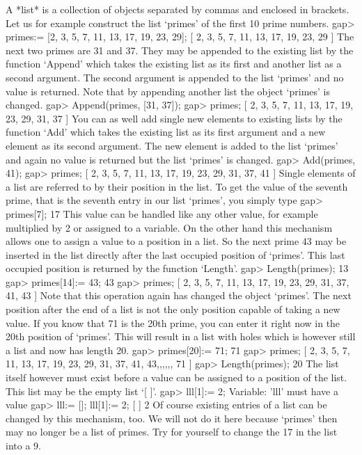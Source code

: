 A *list* is a collection of objects separated by  commas and enclosed  in
brackets.  Let us for example construct the list `primes' of the first 10
prime numbers.
\beginexample
gap> primes:= [2, 3, 5, 7, 11, 13, 17, 19, 23, 29];
[ 2, 3, 5, 7, 11, 13, 17, 19, 23, 29 ]
\endexample
The next two primes are  31 and 37.  They may be appended to the existing
list by the function `Append' which takes  the existing list as its first
and another list as a second argument.  The  second argument  is appended
to the list `primes' and  no  value is returned.  Note that  by appending
another list the object `primes' is changed.
\beginexample
gap> Append(primes, [31, 37]);
gap> primes;
[ 2, 3, 5, 7, 11, 13, 17, 19, 23, 29, 31, 37 ]
\endexample
You can as well add single new elements to existing lists by the function
`Add'  which takes  the existing list  as its  first argument  and  a new
element as  its second argument.  The  new  element  is added to the list
`primes' and again no value is returned but the list `primes' is changed.
\beginexample
gap> Add(primes, 41);
gap> primes;
[ 2, 3, 5, 7, 11, 13, 17, 19, 23, 29, 31, 37, 41 ]
\endexample
Single elements of a list are referred to by their position in the  list.
To get the value  of the seventh prime, that is the seventh entry in  our
list `primes', you simply type
\beginexample
gap> primes[7];
17
\endexample
This value can be handled like any other value, for example multiplied by 2
or assigned to a  variable. On the other hand  this mechanism allows one to
assign a value to  a position in  a  list. So the   next prime 43  may be
inserted  in the   list directly  after the  last   occupied position  of
`primes'. This  last occupied    position  is returned  by  the  function
`Length'.
\beginexample
gap> Length(primes);
13
gap> primes[14]:= 43;
43
gap> primes;
[ 2, 3, 5, 7, 11, 13, 17, 19, 23, 29, 31, 37, 41, 43 ]
\endexample
Note that this operation again has changed the object `primes'.  The
next position after the end of a list is not the only position capable
of taking a new value.  If you know that 71 is the 20th prime, you can
enter it right now in the 20th position of `primes'.  This will result
in a list with holes which is however still a list and now has length
20.
\beginexample
gap> primes[20]:= 71;
71
gap> primes;
[ 2, 3, 5, 7, 11, 13, 17, 19, 23, 29, 31, 37, 41, 43,,,,,, 71 ]
gap> Length(primes);
20
\endexample
The list itself however must  exist before a  value can be  assigned to a
position of the list.  This list may be the empty list `[ ]'.
\begintt
gap> lll[1]:= 2;
Variable: 'lll' must have a value
\endtt
\beginexample
gap> lll:= []; lll[1]:= 2;
[  ]
2
\endexample
Of course  existing entries of a list  can be  changed by this mechanism,
too. We will not do it here because `primes' then may no longer be a list
of primes. Try for yourself to change the 17 in the list into a 9.


